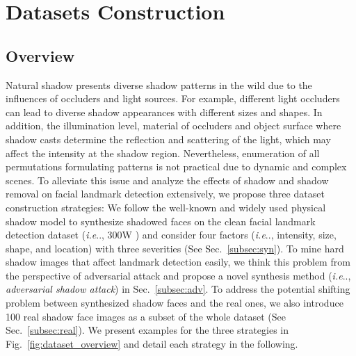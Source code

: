 \documentclass[10pt,twocolumn,letterpaper]{article}
\makeatletter
\newcommand{\figref}[1]{Fig.~\ref{#1}}
\newcommand{\secref}[1]{Sec.~\ref{#1}}
\DeclareRobustCommand\onedot{\futurelet\@let@token\@onedot}
\def\@onedot{\ifx\@let@token.\else.\null\fi\xspace}
\def\ie{\emph{i.e}\onedot} \def\Ie{\emph{I.e}\onedot}
\makeatother
\begin{document}
\section{Datasets Construction} \label{sec:dataset_construction}
%

\subsection{Overview}
%
Natural shadow presents diverse shadow patterns in the wild due to the influences of occluders and light sources. 
%
For example, different light occluders can lead to diverse shadow appearances with different sizes and shapes. 
%
In addition, the illumination level, material of occluders and object surface where shadow casts determine the reflection and scattering of the light, which may affect the intensity at the shadow region.
%
Nevertheless, enumeration of all permutations formulating patterns is not practical due to dynamic and complex scenes.
%
To alleviate this issue and analyze the effects of shadow and shadow removal on facial landmark detection extensively, we propose three dataset construction strategies: 
%
 We follow the well-known and widely used physical shadow model to synthesize shadowed faces on the clean facial landmark detection dataset (\ie, 300W \cite{sagonas2013300}) and consider four factors (\ie, intensity, size, shape, and location) with three severities (See \secref{subsec:syn}).
%
 To mine hard shadow images that affect landmark detection easily, we think this problem from the perspective of adversarial attack and propose a novel synthesis method (\ie, \textit{adversarial shadow attack}) in \secref{subsec:adv}.
%
 To address the potential shifting problem between synthesized shadow faces and the real ones, we also introduce 100 real shadow face images as a subset of the whole dataset (See \secref{subsec:real}). We present examples for the three strategies in \figref{fig:dataset_overview} and detail each strategy in the following. 

%
\end{document}
